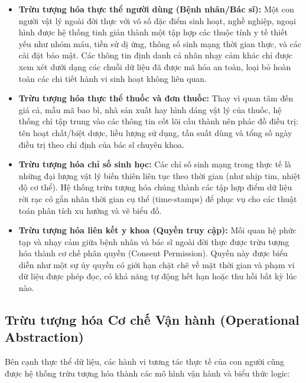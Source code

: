 \documentclass[12pt,a4paper]{report}
\begin{document}
\begin{itemize}[leftmargin=1.5em, itemsep=4pt]
    \item \textbf{Trừu tượng hóa thực thể người dùng (Bệnh nhân/Bác sĩ):} Một con người vật lý ngoài đời thực với vô số đặc điểm sinh hoạt, nghề nghiệp, ngoại hình được hệ thống tinh giản thành một tập hợp các thuộc tính y tế thiết yếu như nhóm máu, tiền sử dị ứng, thông số sinh mạng thời gian thực, và các cài đặt bảo mật. Các thông tin định danh cá nhân nhạy cảm khác chỉ được xem xét dưới dạng các chuỗi dữ liệu đã được mã hóa an toàn, loại bỏ hoàn toàn các chi tiết hành vi sinh hoạt không liên quan.
    \item \textbf{Trừu tượng hóa thực thể thuốc và đơn thuốc:} Thay vì quan tâm đến giá cả, mẫu mã bao bì, nhà sản xuất hay hình dáng vật lý của thuốc, hệ thống chỉ tập trung vào các thông tin cốt lõi cấu thành nên phác đồ điều trị: tên hoạt chất/biệt dược, liều lượng sử dụng, tần suất dùng và tổng số ngày điều trị theo chỉ định của bác sĩ chuyên khoa.
    \item \textbf{Trừu tượng hóa chỉ số sinh học:} Các chỉ số sinh mạng trong thực tế là những đại lượng vật lý biến thiên liên tục theo thời gian (như nhịp tim, nhiệt độ cơ thể). Hệ thống trừu tượng hóa chúng thành các tập hợp điểm dữ liệu rời rạc có gắn nhãn thời gian cụ thể (time-stamps) để phục vụ cho các thuật toán phân tích xu hướng và vẽ biểu đồ.
    \item \textbf{Trừu tượng hóa liên kết y khoa (Quyền truy cập):} Mối quan hệ phức tạp và nhạy cảm giữa bệnh nhân và bác sĩ ngoài đời thực được trừu tượng hóa thành cơ chế phân quyền (Consent Permission). Quyền này được biểu diễn như một sự ủy quyền có giới hạn chặt chẽ về mặt thời gian và phạm vi dữ liệu được phép đọc, có khả năng tự động hết hạn hoặc thu hồi bất kỳ lúc nào.
\end{itemize}

\subsection{Trừu tượng hóa Cơ chế Vận hành (Operational Abstraction)}

Bên cạnh thực thể dữ liệu, các hành vi tương tác thực tế của con người cũng được hệ thống trừu tượng hóa thành các mô hình vận hành và biểu thức logic:
\end{document}
